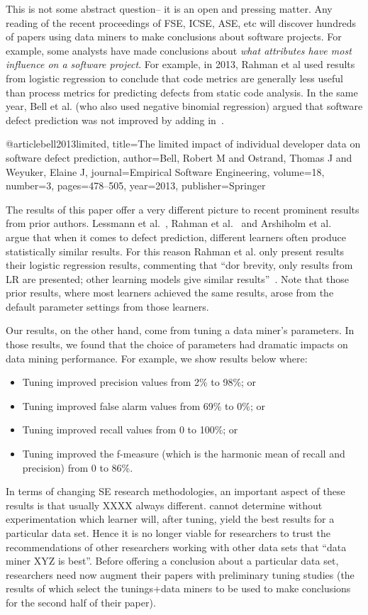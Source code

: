 \documentclass{sig-alternative}
\newcommand{\bi}{\begin{itemize}[leftmargin=0.4cm]}
\newcommand{\ei}{\end{itemize}}
\begin{document}
This is not some abstract question-- it is an open and pressing matter.
Any reading of the recent proceedings of FSE, ICSE, ASE, etc will discover hundreds
of papers using data miners to make conclusions about software projects. 
For example, some  analysts have made conclusions
about 
{\em what attributes
have most influence on a software project}.
For example, in 2013,
Rahman et al
\cite{rahman2013how}  used results from logistic regression to conclude
that code metrics are generally less useful than process
metrics for  predicting defects from static code analysis.  
In the same year, Bell et al. (who also used negative binomial regression) argued that
software defect prediction was not improved by adding in~\cite{bell2013limited}.

@article{bell2013limited,
  title={The limited impact of individual developer data on software defect prediction},
  author={Bell, Robert M and Ostrand, Thomas J and Weyuker, Elaine J},
  journal={Empirical Software Engineering},
  volume={18},
  number={3},
  pages={478--505},
  year={2013},
  publisher={Springer}
}

The results of this paper offer a very different picture  to recent prominent results from prior authors.
Lessmann et al.~\cite{lessmann2008benchmarking}, Rahman et al.~\cite{rahman2013how} and Arshiholm et al.~\cite{arisholm06} argue that when it comes to defect prediction, different learners often
produce statistically similar results. For this reason  Rahman et al. only present results their logistic
regression results, commenting that ``dor brevity, only results from LR are
presented; other learning models give similar results''~\cite{rahman2013how}. Note that those prior results,
where most learners achieved the same results, arose from the default parameter settings from those learners.

Our results, on the other hand, come from tuning a data miner's parameters. In those results,
we found that the choice of parameters had dramatic impacts on data mining performance.
For example, we show results below where:   
\bi 
\item 
Tuning improved precision values from  2\% to 98\%; or
\item 
Tuning improved false alarm values from 69\% to 0\%; or
\item 
Tuning improved recall values from 0 to 100\%; or
\item 
Tuning improved the f-measure (which is the harmonic mean of recall and precision) from 0 to 86\%.
\ei   
In terms of changing SE research methodologies, an important aspect of these results is that usually XXXX always different. cannot determine without experimentation which learner will, after tuning, yield the best results for a particular data set. Hence it is no longer viable for researchers to trust the recommendations 
of other researchers working with other data sets that ``data miner XYZ is best''. Before
offering a conclusion about a particular data set, researchers need now augment  their 
papers with preliminary tuning studies (the results of which select the tunings+data miners to be used
to make conclusions for the second half of their paper).
\end{document}
